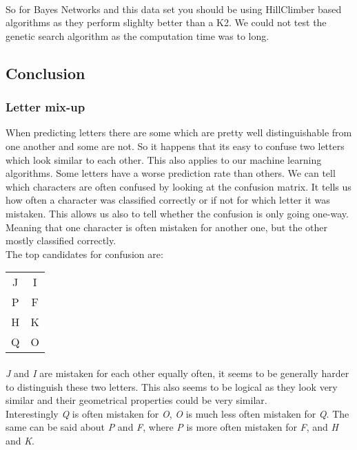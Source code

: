 \documentclass{article}
\begin{document}
\paragraph{}So for Bayes Networks and this data set you should be using HillClimber based algorithms as they perform slighlty better than a K2. We could not test the genetic search algorithm as the computation time was to long.

\subsection{Conclusion}
\subsubsection{Letter mix-up}
When predicting letters there are some which are pretty well distinguishable from one another and some are not. So it happens that its easy to confuse two letters which look similar to each other. This also applies to our machine learning algorithms. Some letters have a worse prediction rate than others. We can tell which characters are often confused by looking at the confusion matrix. It tells us how often a character was classified correctly or if not for which letter it was mistaken. This allows us also to tell whether the confusion is only going one-way. Meaning that one character is often mistaken for another one, but the other mostly classified correctly.\\
The top candidates for confusion are:\\
\begin{center}
\begin{tabular}{  c |  c  }
J & I \\
P & F \\
H & K \\
Q & O \\
\end{tabular}
\end{center}
\paragraph{}\emph{J} and \emph{I} are mistaken for each other equally often, it seems to be generally harder to distinguish these two letters. This also seems to be logical as they look very similar and their geometrical properties could be very similar.\\
Interestingly \emph{Q} is often mistaken for \emph{O}, \emph{O} is much less often mistaken for \emph{Q}. The same can be said about \emph{P} and \emph{F}, where \emph{P} is more often mistaken for \emph{F}, and \emph{H} and \emph{K}.
\end{document}

